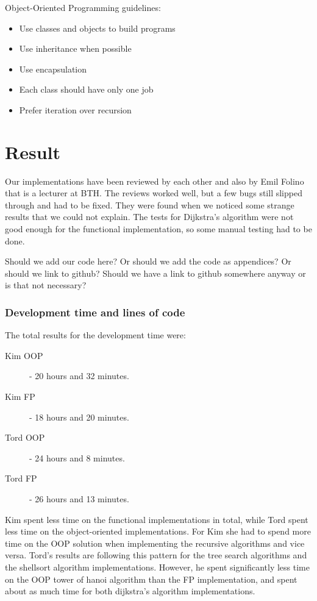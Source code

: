 \documentclass {article}
\begin{document}
Object-Oriented Programming guidelines:
\begin{itemize}
\item Use classes and objects to build programs
\item Use inheritance when possible
\item Use encapsulation
\item Each class should have only one job
\item Prefer iteration over recursion
\end{itemize}

\section{Result}
Our implementations have been reviewed by each other and also by Emil Folino that is a lecturer at BTH. The reviews worked well, but a few bugs still slipped through and had to be fixed. They were found when we noticed some strange results that we could not explain. The tests for Dijkstra's algorithm were not good enough for the functional implementation, so some manual testing had to be done.

Should we add our code here? Or should we add the code as appendices? Or should we link to github? Should we have a link to github somewhere anyway or is that not necessary?
\subsubsection{Development time and lines of code}
The total results for the development time were:
\begin{description}
\item[Kim OOP] - 20 hours and 32 minutes.
\item[Kim FP] - 18 hours and 20 minutes.
\item[Tord OOP] - 24 hours and 8 minutes.
\item[Tord FP] - 26 hours and 13 minutes.
\end{description}

Kim spent less time on the functional implementations in total, while Tord spent less time on the object-oriented implementations. For Kim she had to spend more time on the OOP solution when implementing the recursive algorithms and vice versa. Tord's results are following this pattern for the tree search algorithms and the shellsort algorithm implementations. However, he spent significantly less time on the OOP tower of hanoi algorithm than the FP implementation, and spent about as much time for both dijkstra's algorithm implementations.
\end{document}
